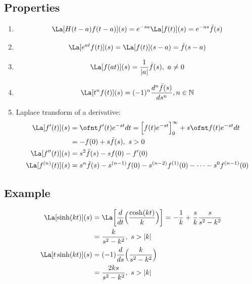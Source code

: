\documentclass[a4paper, 11pt, normalem]{report}
\begin{document}
\subsection{Properties}
\begin{enumerate}
    \item   \begin{equation*}
                \La[H(t - a)f(t - a)](s) = e^{-sa}\La[f(t)](s) = e^{-as}\bar{f}(s)
            \end{equation*}
    \item   \begin{equation*}
                \La[e^{at}f(t)](s) = \La[f(t)](s - a) = \bar{f}(s - a)
            \end{equation*}
    \item   \begin{equation*}
                \La[f(at)](s) = \frac{1}{|a|} \bar{f}(s),~ a \neq 0
            \end{equation*}
    \item   \begin{equation*}
                \La[t^n f(t)](s) = (-1)^n \frac{d^n \bar{f}(s)}{ds^n}, n \in \mathbb{N}
            \end{equation*}
    \item Laplace transform of a derivative:
            \begin{align*}
                \La[f'(t)](s) &= \ofnt f'(t)e^{-st}dt = \Big[f(t)e^{-st}\Big]_{0}^{\infty} + s \ofnt f(t)e^{-st}dt \\
                &= -f(0) + s\bar{f}(s),~ s > 0 \\
                \La[f''(t)](s) &= s^2\bar{f}(s) - sf(0) - f'(0) \\
                \La[f^{(n)}(t)](s) &= s^n \bar{f}(s) - s^{(n - 1)}f(0) - s^{(n - 2)}f^{(1)}(0) - \cdots - s^0 f^{(n - 1)}(0)
            \end{align*}
\end{enumerate}

\subsection{Example}
\begin{align*}
    \La[\sinh(kt)](s) &= \La\bigg[\frac{d}{dt}\Big(\frac{\cosh(kt)}{k}\Big)\bigg] = -\frac{1}{k} + \frac{s}{k} \frac{s}{s^2 - k^2} \\
    &= \frac{k}{s^2 - k^2},~ s > |k| \\
    \La[t\sinh(kt)](s) &= (-1)\frac{d}{ds}\Big(\frac{k}{s^2 - k^2}\Big) \\
    &= \frac{2ks}{s^2 - k^2},~ s > |k|
\end{align*}
\end{document}
